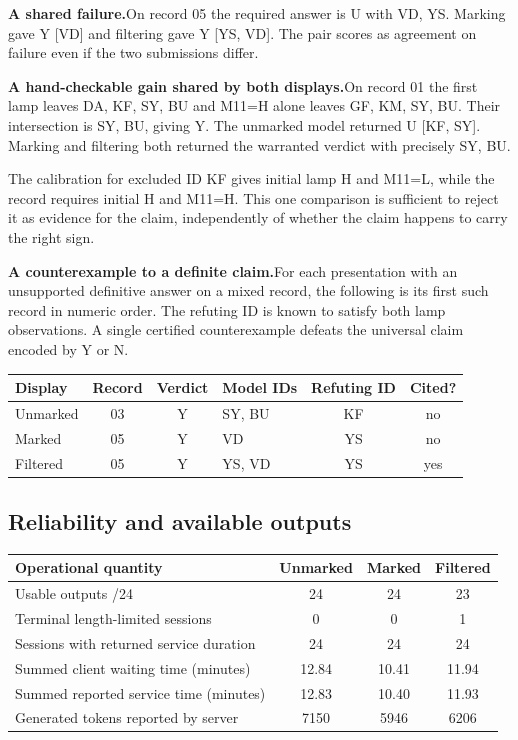 \documentclass[12pt,letterpaper]{article}
\newcommand{\reading}[2]{\par\smallskip\textsf{\color{accent}\bfseries #1}\enspace #2\par}
\begin{document}
\reading{A shared failure.}{On record 05 the required answer is U with VD, YS. Marking gave Y [VD] and filtering gave Y [YS, VD]. The pair scores as agreement on failure even if the two submissions differ.}

\reading{A hand-checkable gain shared by both displays.}{On record 01 the first lamp leaves DA, KF, SY, BU and M11=H alone leaves GF, KM, SY, BU. Their intersection is SY, BU, giving Y. The unmarked model returned U [KF, SY]. Marking and filtering both returned the warranted verdict with precisely SY, BU.}

The calibration for excluded ID KF gives initial lamp H and M11=L, while the record requires initial H and M11=H. This one comparison is sufficient to reject it as evidence for the claim, independently of whether the claim happens to carry the right sign.

\reading{A counterexample to a definite claim.}{For each presentation with an unsupported definitive answer on a mixed record, the following is its first such record in numeric order. The refuting ID is known to satisfy both lamp observations. A single certified counterexample defeats the universal claim encoded by Y or N.}

\begin{center}{\footnotesize\setlength{\tabcolsep}{4pt}\begin{tabularx}{\linewidth}{@{}lccYcc@{}}\toprule
Display & Record & Verdict & Model IDs & Refuting ID & Cited?\\ \midrule
Unmarked & 03 & Y & SY, BU & KF & no\\
Marked & 05 & Y & VD & YS & no\\
Filtered & 05 & Y & YS, VD & YS & yes\\\bottomrule\end{tabularx}}\end{center}

\subsection{Reliability and available outputs}

\begin{center}{\small\setlength{\tabcolsep}{4pt}\begin{tabularx}{\linewidth}{@{}Yccc@{}}\toprule
Operational quantity & Unmarked & Marked & Filtered\\ \midrule
Usable outputs /24 & 24 & 24 & 23\\
Terminal length-limited sessions & 0 & 0 & 1\\
Sessions with returned service duration & 24 & 24 & 24\\
Summed client waiting time (minutes) & 12.84 & 10.41 & 11.94\\
Summed reported service time (minutes) & 12.83 & 10.40 & 11.93\\
Generated tokens reported by server & 7150 & 5946 & 6206\\\bottomrule\end{tabularx}}\end{center}
\end{document}
